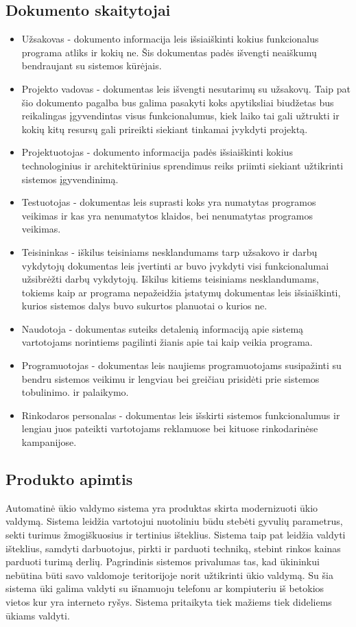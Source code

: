 \documentclass[oneside]{VUMIFPSkursinis}
\begin{document}
\subsection{Dokumento skaitytojai}
\begin{itemize}
	\item Užsakovas - dokumento informacija leis išsiaiškinti kokius funkcionalus programa atliks ir kokių ne. Šis dokumentas padės išvengti neaiškumų bendraujant su sistemos kūrėjais.
	\item Projekto vadovas - dokumentas leis išvengti nesutarimų su užsakovų. Taip pat šio dokumento pagalba bus galima pasakyti koks apytiksliai biudžetas bus reikalingas įgyvendintas visus funkcionalumus, kiek laiko tai gali užtrukti ir kokių kitų resursų gali prireikti siekiant tinkamai įvykdyti projektą.
	\item Projektuotojas - dokumento informacija padės išsiaiškinti kokius technologinius ir architektūrinius sprendimus reiks priimti siekiant užtikrinti sistemos įgyvendinimą.
	\item Testuotojas - dokumentas leis suprasti koks yra numatytas programos veikimas ir kas yra nenumatytos klaidos, bei nenumatytas programos veikimas.
	\item Teisininkas - iškilus teisiniams nesklandumams tarp užsakovo ir darbų vykdytojų dokumentas leis įvertinti ar buvo įvykdyti visi funkcionalumai užsibrėžti darbų vykdytojų. Iškilus kitiems teisiniams nesklandumams, tokiems kaip ar programa nepažeidžia įstatymų dokumentas leis išsiaiškinti, kurios sistemos dalys buvo sukurtos planuotai o kurios ne.
	\item Naudotoja - dokumentas suteiks detalenią informaciją apie sistemą vartotojams norintiems pagilinti žianis apie tai kaip veikia programa.
	\item Programuotojas - dokumentas leis naujiems programuotojams susipažinti su bendru sistemos veikimu ir lengviau bei greičiau prisidėti prie sistemos tobulinimo. ir palaikymo.
	\item Rinkodaros personalas - dokumentas leis išskirti sistemos funkcionalumus ir lengiau juos pateikti vartotojams reklamuose bei kituose rinkodarinėse kampanijose.
\end{itemize}
\pagebreak
\subsection{Produkto apimtis} Automatinė ūkio valdymo sistema yra produktas skirta modernizuoti ūkio valdymą. Sistema leidžia vartotojui nuotoliniu būdu stebėti gyvulių parametrus, sekti turimus žmogiškuosius ir tertinius išteklius. Sistema taip pat leidžia valdyti išteklius, samdyti darbuotojus, pirkti ir parduoti techniką, stebint rinkos kainas parduoti turimą derlių. Pagrindinis sistemos privalumas tas, kad ūkininkui nebūtina būti savo valdomoje teritorijoje norit užtikrinti ūkio valdymą. Su šia sistema ūki galima valdyti su išnamuoju telefonu ar kompiuteriu iš betokios vietos kur yra interneto ryšys. Sistema pritaikyta tiek mažiems tiek dideliems ūkiams valdyti. 
\end{document}
